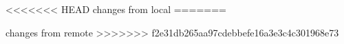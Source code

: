 <<<<<<< HEAD
changes from local
=======

changes from remote
>>>>>>> f2e31db265aa97cdebbefe16a3e3c4c301968e73
